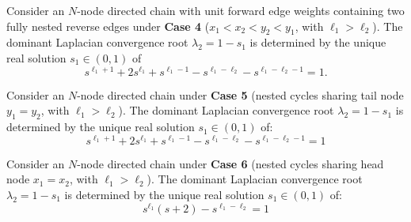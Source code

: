 \documentclass[openright,twoside]{iitbthesis}
\begin{document}
\begin{theo}\label{Theoremcase4}
Consider an $N$-node directed chain with unit forward edge weights containing two fully nested reverse edges under \textbf{Case 4} ($x_1 < x_2 < y_2 < y_1$, with $\ell_1 > \ell_2$). The dominant Laplacian convergence root $\lambda_2 = 1 - s_1$ is determined by the unique real solution $s_1 \in (0,1)$ of
\begin{equation}\label{eq:case4_theorem_statement}
	s^{\ell_1+1} + 2s^{\ell_1} + s^{\ell_1-1} - s^{\ell_1-\ell_2} - s^{\ell_1-\ell_2-1} = 1.
\end{equation}
\end{theo}
\begin{theo}\label{Theoremcase5}
Consider an $N$-node directed chain under \textbf{Case 5} (nested cycles sharing tail node $y_1 = y_2$, with $\ell_1 > \ell_2$). The dominant Laplacian convergence root $\lambda_2 = 1 - s_1$ is determined by the unique real solution $s_1 \in (0,1)$ of:
\begin{equation}\label{eq:case5_theorem_statement}
	s^{\ell_1+1} + 2s^{\ell_1} + s^{\ell_1-1} - s^{\ell_1-\ell_2} - s^{\ell_1-\ell_2-1} = 1
\end{equation}
\end{theo}
\begin{theo}\label{theo10}
Consider an $N$-node directed chain under \textbf{Case 6} (nested cycles sharing head node $x_1 = x_2$, with $\ell_1 > \ell_2$). The dominant Laplacian convergence root $\lambda_2 = 1 - s_1$ is determined by the unique real solution $s_1 \in (0,1)$ of:
\begin{equation}\label{eq:case6_statement}
	s^{\ell_1}(s+2) - s^{\ell_1-\ell_2} = 1
\end{equation}
\end{theo}
\end{document}
